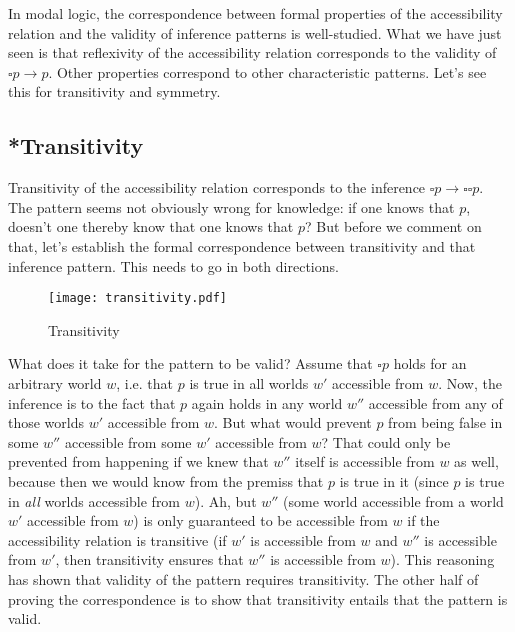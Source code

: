 In modal logic, the correspondence between formal properties of the
accessibility relation and the validity of inference patterns is
well-studied. What we have just seen is that reflexivity of the
accessibility relation corresponds to the validity of
$\square p \rightarrow p$. Other properties correspond to other
characteristic patterns. Let's see this for transitivity and symmetry.

\subsection{*Transitivity} \label{sec:transitivity}

Transitivity of the accessibility relation corresponds to the
inference $\square p \rightarrow \square \square p$.
The pattern seems not obviously wrong for knowledge: if one knows that
$p$, doesn't one thereby know that one knows that $p$? But before we
comment on that, let's establish the formal correspondence between
transitivity and that inference pattern. This needs to go in both
directions.
  
\begin{figure}[htbp]
  \centering
    \texttt{[image: transitivity.pdf]}
  \caption{Transitivity}
  \label{fig:transitivity}
\end{figure}

\noindent What does it take for the pattern to be valid? Assume that
$\square p$ holds for an arbitrary world $w$, i.e. that $p$ is true in
all worlds $w'$ accessible from $w$. Now, the inference is to the fact
that $p$ again holds in any world $w''$ accessible from any of
those worlds $w'$ accessible from $w$. But what would prevent $p$ from
being false in some $w''$ accessible from some $w'$ accessible from
$w$? That could only be prevented from happening if we knew that $w''$
itself is accessible from $w$ as well, because then we would know from
the premiss that $p$ is true in it (since $p$ is true in \emph{all}
worlds accessible from $w$). Ah, but $w''$ (some world accessible from
a world $w'$ accessible from $w$) is only guaranteed to be accessible
from $w$ if the accessibility relation is transitive (if $w'$ is
accessible from $w$ and $w''$ is accessible from $w'$, then
transitivity ensures that $w''$ is accessible from $w$). This
reasoning has shown that validity of the pattern requires
transitivity. The other half of proving the correspondence is to show
that transitivity entails that the pattern is valid.


